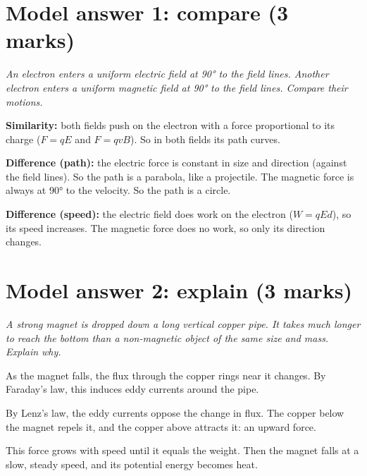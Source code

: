 \section*{Model answer 1: compare (3 marks)}

\emph{An electron enters a uniform electric field at \ang{90} to the field lines. Another
electron enters a uniform magnetic field at \ang{90} to the field lines. Compare their
motions.}

\begin{modelanswer}
 \textbf{Similarity:} both fields push on the electron with a force proportional to
its charge ($F = qE$ and $F = qvB$). So in both fields its path curves.

 \textbf{Difference (path):} the electric force is constant in size and direction
(against the field lines). So the path is a parabola, like a projectile. The magnetic force
is always at \ang{90} to the velocity. So the path is a circle.

 \textbf{Difference (speed):} the electric field does work on the electron
($W = qEd$), so its speed increases. The magnetic force does no work, so only its direction
changes.
\end{modelanswer}

\begin{markingcriteria}
\end{markingcriteria}

\section*{Model answer 2: explain (3 marks)}

\emph{A strong magnet is dropped down a long vertical copper pipe. It takes much longer to
reach the bottom than a non-magnetic object of the same size and mass. Explain why.}

\begin{modelanswer}
 As the magnet falls, the flux through the copper rings near it changes. By
Faraday's law, this induces eddy currents around the pipe.

 By Lenz's law, the eddy currents oppose the change in flux. The copper below the
magnet repels it, and the copper above attracts it: an upward force.

 This force grows with speed until it equals the weight. Then the magnet falls at
a slow, steady speed, and its potential energy becomes heat.
\end{modelanswer}

